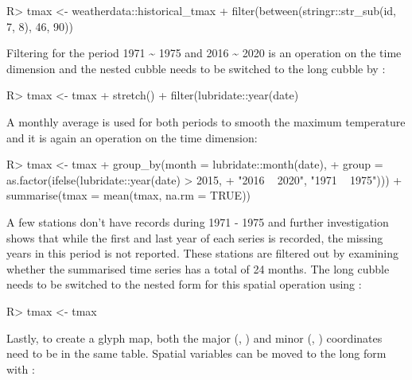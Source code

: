 \documentclass[
]{jss}
\begin{document}
\begin{CodeChunk}
\begin{CodeInput}
R> tmax <- weatherdata::historical_tmax %
+   filter(between(stringr::str_sub(id, 7, 8), 46, 90))
\end{CodeInput}
\end{CodeChunk}

Filtering for the period 1971 \textasciitilde{} 1975 and 2016
\textasciitilde{} 2020 is an operation on the time dimension and the
nested cubble needs to be switched to the long cubble by
:

\begin{CodeChunk}
\begin{CodeInput}
R> tmax <- tmax %
+   stretch() %
+   filter(lubridate::year(date) %
\end{CodeInput}
\end{CodeChunk}

A monthly average is used for both periods to smooth the maximum
temperature and it is again an operation on the time dimension:

\begin{CodeChunk}
\begin{CodeInput}
R> tmax <- tmax %
+   group_by(month = lubridate::month(date), 
+          group = as.factor(ifelse(lubridate::year(date) > 2015, 
+                                   "2016 ~ 2020", "1971 ~ 1975"))) %
+   summarise(tmax = mean(tmax, na.rm = TRUE))
\end{CodeInput}
\end{CodeChunk}

A few stations don't have records during 1971 - 1975 and further
investigation shows that while the first and last year of each series is
recorded, the missing years in this period is not reported. These
stations are filtered out by examining whether the summarised time
series has a total of 24 months. The long cubble needs to be switched to
the nested form for this spatial operation using :

\begin{CodeChunk}
\begin{CodeInput}
R> tmax <- tmax %
\end{CodeInput}
\end{CodeChunk}

Lastly, to create a glyph map, both the major (,
) and minor (, ) coordinates need
to be in the same table. Spatial variables can be moved to the long form
with :
\end{document}
